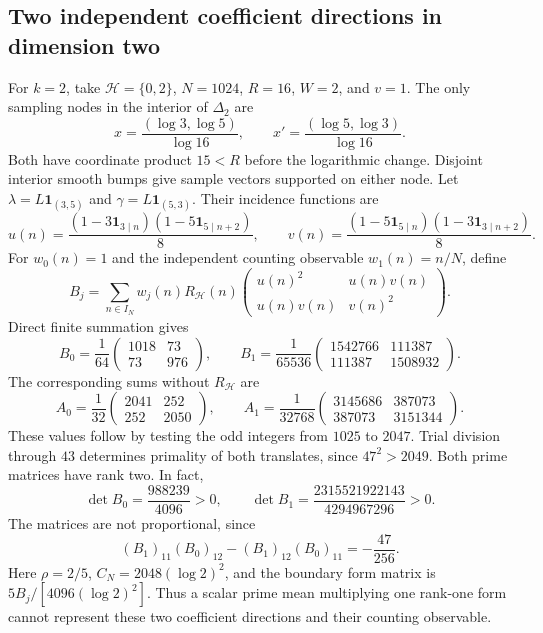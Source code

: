 \subsection{Two independent coefficient directions in dimension two}

For $k=2$, take $\mathcal H=\{0,2\}$, $N=1024$, $R=16$, $W=2$, and $v=1$.
The only sampling nodes in the interior of $\Delta_2$ are
\[
 x=\frac{(\log3,\log5)}{\log16},\qquad
 x'=\frac{(\log5,\log3)}{\log16}.
\]
Both have coordinate product $15<R$ before the logarithmic change.
Disjoint interior smooth bumps give sample vectors supported on either node.
Let $\lambda=L\mathbf1_{(3,5)}$ and $\gamma=L\mathbf1_{(5,3)}$.
Their incidence functions are
\[
 u(n)=\frac{(1-3\mathbf1_{3\mid n})(1-5\mathbf1_{5\mid n+2})}{8},\qquad
 v(n)=\frac{(1-5\mathbf1_{5\mid n})(1-3\mathbf1_{3\mid n+2})}{8}.
\]
For $w_0(n)=1$ and the independent counting observable $w_1(n)=n/N$, define
\[
 B_j=\sum_{n\in I_N}w_j(n)R_{\mathcal H}(n)
       \begin{pmatrix}u(n)^2&u(n)v(n)\\u(n)v(n)&v(n)^2\end{pmatrix}.
\]
Direct finite summation gives
\begin{equation}\label{acfr:two-matrices}
 B_0=\frac1{64}\begin{pmatrix}1018&73\\73&976\end{pmatrix},\qquad
 B_1=\frac1{65536}\begin{pmatrix}1542766&111387\\111387&1508932\end{pmatrix}.
\end{equation}
The corresponding sums without $R_{\mathcal H}$ are
\[
 A_0=\frac1{32}\begin{pmatrix}2041&252\\252&2050\end{pmatrix},\qquad
 A_1=\frac1{32768}\begin{pmatrix}3145686&387073\\387073&3151344\end{pmatrix}.
\]
These values follow by testing the odd integers from $1025$ to $2047$.
Trial division through $43$ determines primality of both translates,
since $47^2>2049$.
Both prime matrices have rank two.  In fact,
\[
 \det B_0=\frac{988239}{4096}>0,\qquad
 \det B_1=\frac{2315521922143}{4294967296}>0.
\]
The matrices are not proportional, since
\[
 (B_1)_{11}(B_0)_{12}-(B_1)_{12}(B_0)_{11}=-\frac{47}{256}.
\]
Here $\rho=2/5$, $C_N=2048(\log2)^2$, and the boundary form matrix is
$5B_j/[4096(\log2)^2]$.
Thus a scalar prime mean multiplying one rank-one form cannot represent
these two coefficient directions and their counting observable.

